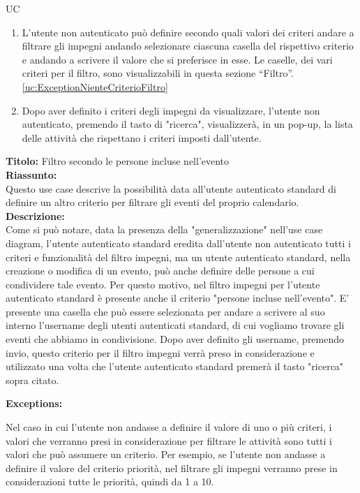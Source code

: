 \begin{listaPersonale}{UC}
\begin{listaPersonale2}[UC] {}
\begin{enumerate}
                \item L'utente non autenticato può definire secondo quali valori dei criteri andare a filtrare gli impegni andando selezionare ciascuna casella del rispettivo criterio e andando a scrivere il valore che si preferisce in esse. Le caselle, dei vari criteri per il filtro, sono visualizzabili in questa sezione “Filtro”. \ref{uc:ExceptionNienteCriterioFiltro}
                \item Dopo aver definito i criteri degli impegni da visualizzare, l'utente non autenticato, premendo il tasto di "ricerca", visualizzerà, in un pop-up, la lista delle attività che rispettano i criteri imposti dall'utente.
            \end{enumerate}

                \textbf{Titolo: } Filtro secondo le persone incluse nell'evento \\
                \textbf{Riassunto: } \\ Questo use case descrive la possibilità data all'utente autenticato standard di definire un altro criterio per filtrare gli eventi del proprio calendario.\\
                \textbf{Descrizione: } \\ Come si può notare, data la presenza della "generalizzazione" nell'use case diagram, l'utente autenticato standard eredita dall'utente non autenticato tutti i criteri e funzionalità del filtro impegni, ma un utente autenticato standard, nella creazione o modifica di un evento, può anche definire delle persone a cui condividere tale evento. Per questo motivo, nel filtro impegni per l'utente autenticato standard è presente anche il criterio "persone incluse nell'evento". E' presente una casella che può essere selezionata per andare a scrivere al suo interno l'username degli utenti autenticati standard, di cui vogliamo trovare gli eventi che abbiamo in condivisione.
                Dopo aver definito gli username, premendo invio, questo criterio per il filtro impegni verrà preso in considerazione e utilizzato una volta che l'utente autenticato standard premerà il tasto "ricerca" sopra citato.

                \textbf{Exceptions:}
                \begin{enumerate}[label=\textbf{[exception \arabic{enumiii}]}, ref= \textbf{[exception \arabic{enumiii}]}]
                     Nel caso in cui l'utente non andasse a definire il valore di uno o più criteri, i valori che verranno presi in considerazione per filtrare le attività sono tutti i valori che può assumere un criterio. Per esempio, se l'utente non andasse a definire il valore del criterio priorità, nel filtrare gli impegni verranno prese in considerazioni tutte le priorità, quindi da 1 a 10.
                \end{enumerate}
    \end{listaPersonale2}


\end{listaPersonale}

